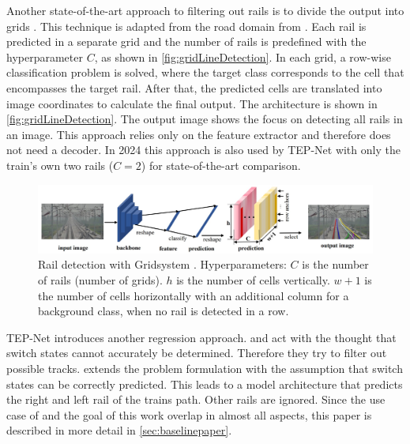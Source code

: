 
Another state-of-the-art approach to filtering out rails is to divide the output into grids \cite{li2022rail}.
This technique is adapted from the road domain from \cite{laneDetectionGrid2020}.
Each rail is predicted in a separate grid and the number of rails is predefined with the hyperparameter $C$, as shown in \autoref{fig:gridLineDetection}.
In each grid, a row-wise classification problem is solved, where the target class corresponds to the cell that encompasses the target rail.
After that, the predicted cells are translated into image coordinates to calculate the final output.
The architecture is shown in \autoref{fig:gridLineDetection}.
The output image shows the focus on detecting all rails in an image.
This approach relies only on the feature extractor and therefore does not need a decoder.
In 2024 this approach is also used by TEP-Net \cite{tepNet2024} with only the train's own two rails ($C=2$) for state-of-the-art comparison.

\begin{figure}[H]
    \centering
    \includegraphics[width=\linewidth]{PICs/lineDetection/gridDetection.jpg}
    \caption{Rail detection with Gridsystem \cite{li2022rail}. Hyperparameters: $C$ is the number of rails (number of grids). $h$ is the number of cells vertically. $w+1$ is the number of cells horizontally with an additional column for a background class, when no rail is detected in a row.}
    \label{fig:gridLineDetection}
\end{figure}

\noindent \ac{TEP}-Net \cite{tepNet2024} introduces another regression approach.
\cite{RailraodSemanticPossibleTracks2020} and \cite{TPENet2023} act with the thought that switch states cannot accurately be determined.
Therefore they try to filter out possible tracks.
\cite{tepNet2024} extends the problem formulation with the assumption that switch states can be correctly predicted.
This leads to a model architecture that predicts the right and left rail of the trains path.
Other rails are ignored.
Since the use case of \cite{tepNet2024} and the goal of this work overlap in almost all aspects, this paper is described in more detail in \autoref{sec:baselinepaper}.